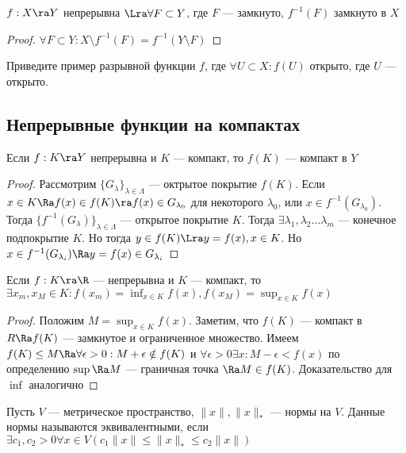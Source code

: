 \begin{corollary}
    \(f: X \ra Y\) непрерывна \(\Lra \forall F \subset Y\), где \(F\) --- замкнуто, \(f^{-1}(F)\) замкнуто  в \(X\)
\end{corollary}
\begin{proof}
    \(\forall F \subset Y: X \setminus f^{-1}(F) = f^{-1}(Y \setminus F)\)
\end{proof}

\begin{problem}
    Приведите пример разрывной функции \(f\), где \(\forall U \subset X: f(U)\) открыто, где \(U\) --- открыто.
\end{problem}

\subsection{Непрерывные функции на компактах}
\begin{theorem}
    Если \(f: K \ra Y\) непрерывна и \(K\) --- компакт, то \(f(K)\) --- компакт в \(Y\)
\end{theorem}
\begin{proof}
    Рассмотрим \(\{G_\lambda\}_{\lambda \in \Lambda}\) --- октрытое покрытие \(f(K)\). Если \(x \in K \Ra f(x) \in f(K) \ra f(x) \in G_{\lambda_0}\) для некоторого \(\lambda_0\), или \(x \in f^{-1}(G_{\lambda_0})\). Тогда \(\{f^{-1}(G_{\lambda})\}_{\lambda \in \Lambda}\) --- открытое покрытие \(K\). Тогда \(\exists \lambda_1, \lambda_2 \dots \lambda_m\) --- конечное подпокрытие \(K\). Но тогда \(y \in f(K) \Lra y = f(x), x \in K\). Но \(x \in f^{-1}(G_{\lambda_i}) \Ra y = f(x) \in G_{\lambda_i}\)
\end{proof}

\begin{theorem}[Вейерштрасса]
    Если \(f: K \ra \R\) --- непрерывна и \(K\) --- компакт, то \(\exists x_m, x_M \in K: f(x_m) = \inf_{x \in K}f(x), f(x_M) = \sup_{x \in K}f(x)\)
\end{theorem}
\begin{proof}
    Положим \(M = \sup_{x \in K}f(x)\). Заметим, что \(f(K)\) --- компакт в \(R \Ra f(K)\) --- замкнутое и ограниченное множество. Имеем \(f(K) \le M \Ra \forall \epsilon > 0: M + \epsilon \notin f(K)\) и \(\forall \epsilon > 0 \exists x: M - \epsilon < f(x)\) по определению \(\sup \Ra M\) --- граничная точка \(\Ra M \in f(K)\). Доказательство для \(\inf\) аналогично
\end{proof}

\begin{definition}
    Пусть \(V\) --- метрическое пространство, \(\|x\|, \|x\|_*\) --- нормы на \(V\). Данные нормы называются эквивалентными, если \(\exists c_1, c_2 > 0 \forall x \in V (c_1\|x\| \le \|x\|_* \le c_2\|x\|)\)
\end{definition}

